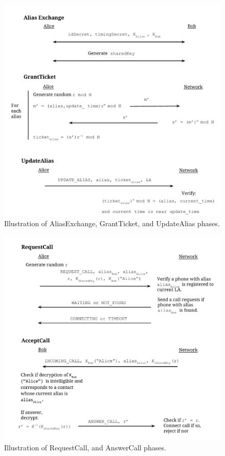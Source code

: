 \documentclass[11pt]{article}
\begin{document}
\begin{figure}[p]
	\caption{Illustration of AliasExchange, GrantTicket, and UpdateAlias phases.}
	\centering
	\includegraphics[scale=0.65]{ProtocolsIllustration.pdf}
\end{figure}

\begin{figure}[p]
	\caption{Illustration of RequestCall, and AnswerCall phases.}
	\centering
	\includegraphics[scale=.65]{ProtocolsIllustration2.pdf}
\end{figure}
\end{document}
